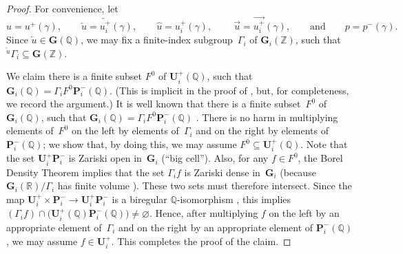 \documentclass[11pt]{article}
\numberwithin{equation}{section}
\newcommand{\QQ}{\mathbb{Q}}
\newcommand{\RR}{\mathbb{R}}
\newcommand{\ZZ}{\mathbb{Z}}
\newcommand{\Ga}{\mathbf{G}}
\newcommand{\Pa}{\mathbf{P}}
\newcommand{\Ua}{\mathbf{U}}
\newcommand{\ra}{\overrightarrow}
\newcommand{\la}{\overleftarrow}
\numberwithin{equation}{section}
\theoremstyle{definition}
\begin{document}
\begin{proof}For convenience, let
	\[ u = u^+(\gamma), \qquad \overleftarrow{u} = \la{u^+_i}(\gamma), \qquad \widehat{u} = u^+_i(\gamma), \ \qquad \overrightarrow{u} = \ra{u^+_i}(\gamma), \qquad \text{and}\qquad p = p^-(\gamma) .\]
Since $\overleftarrow{u} \in \Ga(\QQ)$, we may fix a finite-index subgroup~$\Gamma_i$ of $\Ga_i(\ZZ)$, such that ${}^{\overleftarrow{u}}\Gamma_i \subseteq \Ga(\ZZ)$.

We claim there is a finite subset $F^0$ of $\Ua^+_i(\QQ)$, such that $\Ga_i(\QQ) = \Gamma_i F^0 \Pa_i^-(\QQ)$. (This is implicit in the proof of \cite[Lemma~4.19]{MR1828742}, but, for completeness, we record the argument.) It is well known that there is a finite subset~$F^0$ of $\Ga_i(\QQ)$, such that $\Ga_i(\QQ) = \Gamma_i F^0 \Pa_i^-(\QQ)$ \cite[Proposition~15.6]{MR0244260}. There is no harm in multiplying elements of~$F^0$ on the left by elements of~$\Gamma_i$ and on the right by elements of~$\Pa_i^-(\QQ)$; we show that, by doing this, we may assume $F^0 \subseteq \Ua^+_i(\QQ)$.
Note that the set $\Ua^+_i \Pa_i^-$ is Zariski open in~$\Ga_i$ (``big cell'').
Also, for any $f \in F^0$, the Borel Density Theorem \cite[Theorem~4.10, p.~205] {MR1278263} implies that the set $\Gamma_i f$ is Zariski dense in~$\Ga_i$ (because $\Ga_i(\RR)/\Gamma_i$ has finite volume \cite[Theorem~4.13, p.~213]{MR1278263}). These two sets must therefore intersect. Since the map $\Ua^+_i \times \Pa_i^- \to \Ua^+_i \Pa_i^-$ is a biregular $\QQ$-isomorphism \cite[Proposition~3.24, p.~84]{BorelTits-GrpRed}, this implies $(\Gamma_i f) \cap \bigl(\Ua^+_i(\QQ) \Pa_i^-(\QQ) \bigr) \neq \varnothing$. Hence, after multiplying $f$ on the left by an appropriate element of~$\Gamma_i$ and on the right by an appropriate element of $\Pa_i^-(\QQ)$, we may assume $f \in \Ua^+_i$. This completes the proof of the claim.


\end{proof}
\end{document}
